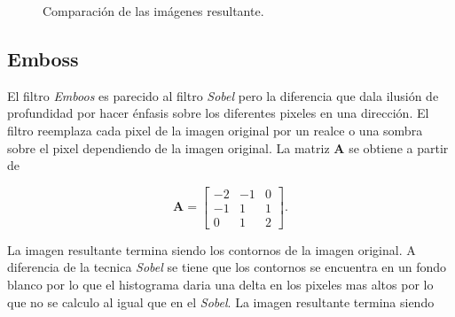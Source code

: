 \begin{figure}[H]
	\caption{Comparación de las imágenes resultante\label{fig:sobel}.}
\end{figure}	

\subsection{Emboss}

El filtro \textit{Emboos} es parecido al filtro \textit{Sobel} pero la diferencia que dala ilusión de profundidad por hacer énfasis sobre los diferentes pixeles en una dirección. El filtro reemplaza cada pixel de la imagen original por un realce o una sombra sobre el pixel dependiendo de la imagen original. La matriz \textbf{A} se obtiene a partir de

\begin{equation}
\textbf{A}=\begin{bmatrix}
-2 &-1 &0\\
-1 &1 &1\\
0 &1 &2
\end{bmatrix}.
\end{equation}

La imagen resultante termina siendo los contornos de la imagen original. A diferencia de la tecnica \textit{Sobel} se tiene que los contornos se encuentra en un fondo blanco por lo que el histograma daria una delta en los pixeles mas altos por lo que no se calculo al igual que en el \textit{Sobel}. La imagen resultante termina siendo 

